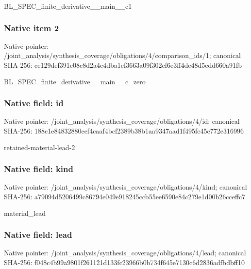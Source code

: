 \documentclass[10pt,a4paper]{article}
\begin{document}
\begingroup\raggedright\sloppy BL\_\allowbreak{}SPEC\_\allowbreak{}finite\_\allowbreak{}derivative\_\allowbreak{}\_\allowbreak{}main\_\allowbreak{}\_\allowbreak{}c1\par\endgroup

\subsubsection{Native item 2}
Native pointer: /joint\_\allowbreak{}analysis/synthesis\_\allowbreak{}coverage/obligations/4/comparison\_\allowbreak{}ids/1; canonical SHA-256: ce129def391c08c8d2a4c4dba1ef3663a09f302cf6e3ff4de48d5edd660a91fb

\begingroup\raggedright\sloppy BL\_\allowbreak{}SPEC\_\allowbreak{}finite\_\allowbreak{}derivative\_\allowbreak{}\_\allowbreak{}main\_\allowbreak{}\_\allowbreak{}c\_\allowbreak{}zero\par\endgroup

\subsubsection{Native field: id}
Native pointer: /joint\_\allowbreak{}analysis/synthesis\_\allowbreak{}coverage/obligations/4/id; canonical SHA-256: 188c1e84832880eef4caaf4bcf2389b38b1aa9347aad1f495fc45c772e316996

\begingroup\raggedright\sloppy retained-material-lead-2\par\endgroup

\subsubsection{Native field: kind}
Native pointer: /joint\_\allowbreak{}analysis/synthesis\_\allowbreak{}coverage/obligations/4/kind; canonical SHA-256: a79094d5206499c86794e049e918245ccb55ee6590e84c279e1d00b26cceffc7

\begingroup\raggedright\sloppy material\_\allowbreak{}lead\par\endgroup

\subsubsection{Native field: lead}
Native pointer: /joint\_\allowbreak{}analysis/synthesis\_\allowbreak{}coverage/obligations/4/lead; canonical SHA-256: f048c4b99a9801f261121d133fc23966b0b734f645e7130c6d2836adfbdbff10
\end{document}
